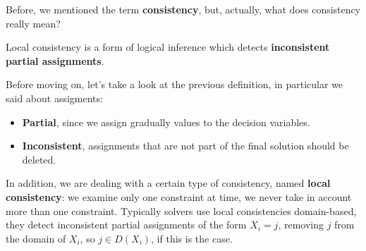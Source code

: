 Before, we mentioned the term \textbf{consistency}, but, actually, what does consistency really mean?
\begin{definition}[title = Local consistency]
   Local consistency is a form of logical inference which detects \textbf{inconsistent partial assignments}.
\end{definition}
Before moving on, let's take a look at the previous definition, in particular we said about assigments:
\begin{itemize}
    \renewcommand{\labelitemi}{-}
    \item \textbf{Partial}, since we assign gradually values to the decision variables.
    \item \textbf{Inconsistent}, assignments that are not part of the final solution should be deleted.
\end{itemize}
In addition, we are dealing with a certain type of consistency, named \textbf{local consistency}: we examine only one constraint at time, we never take in account 
more than one constraint. Typically solvers use local consistencies domain-based, they detect inconsistent partial assignments of the form $X_i = j$, removing 
$j$ from the domain of $X_i$, so $j \in D(X_i)$, if this is the case.